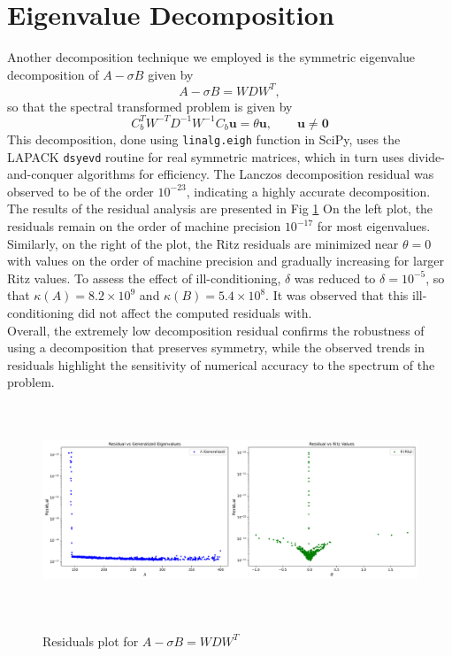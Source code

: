 \section{Eigenvalue Decomposition}
Another decomposition technique we employed is the symmetric eigenvalue decomposition of $A-\sigma B$ given by
\begin{equation}
    A-\sigma B = WDW^T,
\end{equation}
so that the spectral transformed problem is given by
\begin{equation}\label{3.4}
	C_b^T W^{-T}D^{-1}W^{-1} C_b \mathbf{u} = \theta \mathbf{u}, \qquad \mathbf{u} \neq \mathbf{0}
\end{equation}
This decomposition, done using \texttt{linalg.eigh} function in SciPy, uses the LAPACK \texttt{dsyevd} routine for real symmetric matrices, which in turn uses divide-and-conquer algorithms for efficiency. The Lanczos decomposition residual was observed to be of the order $10^{-23}$, indicating a highly accurate decomposition. The results of the residual analysis are presented in Fig \ref{fig:EigDecompRes}
On the left plot, the residuals remain on the order of machine precision $10^{-17}$ for most eigenvalues. Similarly, on the right of the plot, the Ritz residuals are minimized near $\theta = 0$ with values on the order of machine precision and gradually increasing for larger Ritz values. To assess the effect of ill-conditioning, $\delta$ was reduced to $\delta = 10^{-5}$, so that $\kappa(A) = 8.2 \times 10^9$ and $\kappa(B) = 5.4 \times 10^8$. It was observed that this ill-conditioning did not affect the computed residuals with.\\
Overall, the extremely low decomposition residual confirms the robustness of using a decomposition that preserves symmetry, while the observed trends in residuals highlight the sensitivity of numerical accuracy to the spectrum of the problem.

\begin{figure}
\centering
        \caption{Residuals plot for $A -\sigma B = WDW^T$}
	\includegraphics[height=2.5in]{./Plots/eigdecomp/eig_residual_plots.png}
        \label{fig:EigDecompRes}
\end{figure}



